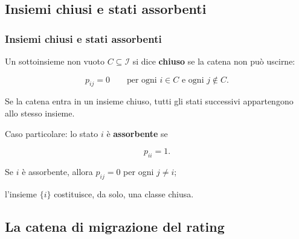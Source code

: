 

\subsection{Insiemi chiusi e stati assorbenti}%

\begin{frame}%
%

\frametitle{Insiemi chiusi e stati assorbenti}%
%

%


Un sottoinsieme non vuoto $C\subseteq\mathcal{I}$ si dice \textbf{chiuso} se
la catena non pu\`{o} uscirne:%

\[
p_{ij}=0 \qquad\text{per ogni }i\in C \text{ e ogni }j\notin C.
\]


Se la catena entra in un insieme chiuso, tutti gli stati successivi
appartengono allo stesso insieme.

\medskip

Caso particolare: lo stato $i$ \`{e} \textbf{assorbente} se%

\[
p_{ii}=1.
\]


\medskip

\begin{stepitemize}
\item Se $i$ \`{e} assorbente, allora $p_{ij}=0$ per ogni $j\neq i$;

\item l'insieme $\{i\}$ costituisce, da solo, una classe chiusa.
\end{stepitemize}

%

\transboxout
\end{frame}%




\subsection{La catena di migrazione del rating}%


